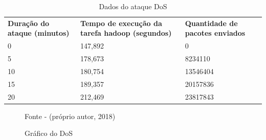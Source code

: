 \newpage

\begin{table}[h]
 \centering
 {\renewcommand\arraystretch{1.25}
 \caption{Dados do ataque DoS}
 \label{dadosDoDDOS}
 \begin{tabular}{ l l l }
  \cline{1-1}\cline{2-2}\cline{3-3}  
    \multicolumn{1}{|p{3.150cm}|}{\textbf{Duração do ataque (minutos)} \centering } &
    \multicolumn{1}{p{4.500cm}|}{\textbf{Tempo de execução da tarefa hadoop (segundos)} \centering } &
    \multicolumn{1}{p{2.350cm}|}{\textbf{Quantidade de pacotes enviados} \centering }
  \\  
  \cline{1-1}\cline{2-2}\cline{3-3}  
    \multicolumn{1}{|p{3.150cm}|}{0 \centering } &
    \multicolumn{1}{p{4.500cm}|}{147,892 \centering } &
    \multicolumn{1}{p{2.350cm}|}{0 \centering }
  \\  
  \cline{1-1}\cline{2-2}\cline{3-3}  
    \multicolumn{1}{|p{3.150cm}|}{5 \centering } &
    \multicolumn{1}{p{4.500cm}|}{178,673 \centering } &
    \multicolumn{1}{p{2.350cm}|}{8234110 \centering }
  \\  
  \cline{1-1}\cline{2-2}\cline{3-3}  
    \multicolumn{1}{|p{3.150cm}|}{10 \centering } &
    \multicolumn{1}{p{4.500cm}|}{180,754 \centering } &
    \multicolumn{1}{p{2.350cm}|}{13546404 \centering }
  \\  
  \cline{1-1}\cline{2-2}\cline{3-3}  
    \multicolumn{1}{|p{3.150cm}|}{15 \centering } &
    \multicolumn{1}{p{4.500cm}|}{189,357 \centering } &
    \multicolumn{1}{p{2.350cm}|}{20157836 \centering }
  \\
  \cline{1-1}\cline{2-2}\cline{3-3}  
    \multicolumn{1}{|p{3.150cm}|}{20 \centering } &
    \multicolumn{1}{p{4.500cm}|}{212,469 \centering } &
    \multicolumn{1}{p{2.350cm}|}{23817843 \centering }
    \\
  \hline

 \end{tabular} }
\end{table}


\begin{figure}[htbp!] \begin{center}
\caption{Gráfico do DoS}
\small{Fonte - (próprio autor, 2018)}
\label{Fig:grafico do dos}
\end{center} \end{figure}

